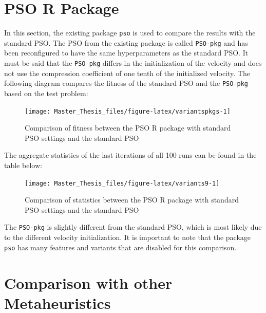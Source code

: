 \documentclass[
  oneside, a4paper, 12pt, openany]{book}
\theoremstyle{definition}
\theoremstyle{definition}
\theoremstyle{definition}
\theoremstyle{definition}
\theoremstyle{remark}
\begin{document}
\hypertarget{pso-r-package}{%
\section{PSO R Package}\label{pso-r-package}}

In this section, the existing package \texttt{pso} is used to compare the results with the standard PSO. The PSO from the existing package is called \texttt{PSO-pkg} and has been reconfigured to have the same hyperparameters as the standard PSO. It must be said that the \texttt{PSO-pkg} differs in the initialization of the velocity and does not use the compression coefficient of one tenth of the initialized velocity. The following diagram compares the fitness of the standard PSO and the \texttt{PSO-pkg} based on the test problem:

\vspace{-0.2cm}

\begin{figure}[H]
\texttt{[image: Master\_Thesis\_files/figure-latex/variantspkgs-1]} \caption{Comparison of fitness between the PSO R package with standard PSO settings and the standard PSO}\label{fig:variantspkgs}
\end{figure}

\vspace{-0.1cm}

The aggregate statistics of the last iterations of all 100 runs can be found in the table below:
\vspace{-0.2cm}

\begin{figure}[H]
\texttt{[image: Master\_Thesis\_files/figure-latex/variants9-1]} \caption{Comparison of statistics between the PSO R package with standard PSO settings and the standard PSO}\label{fig:variants9}
\end{figure}
\vspace{-0.6cm}

The \texttt{PSO-pkg} is slightly different from the standard PSO, which is most likely due to the different velocity initialization. It is important to note that the package \texttt{pso} has many features and variants that are disabled for this comparison.

\hypertarget{comparison-with-other-metaheuristics}{%
\section{Comparison with other Metaheuristics}\label{comparison-with-other-metaheuristics}}
\end{document}
